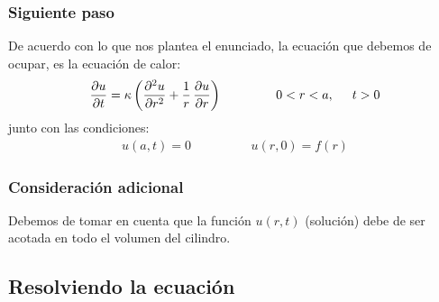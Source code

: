 \documentclass[12pt]{beamer}
\begin{document}
\begin{frame}
\frametitle{Siguiente paso}
De acuerdo con lo que nos plantea el enunciado, la ecuación que debemos de ocupar, es la ecuación de calor:
\pause
\begin{align}
\pdv{u}{t} = \kappa \left( \pdv[2]{u}{r} + \dfrac{1}{r}  \, \pdv{u}{r} \right) \hspace{1.5cm} 0 < r < a, \hspace{0.5cm} t > 0
\label{eq:ecuacion_CilBessel_01}
\end{align}
\pause
junto con las condiciones:
\pause
\begin{align}
u(a, t) = 0 \hspace{2cm} u(r, 0) = f(r)
\label{eq:ecuacion_CilBessel_02}
\end{align}
\end{frame}
\begin{frame}
\frametitle{Consideración adicional}
Debemos de tomar en cuenta que la función $u(r, t)$ (solución) debe de ser acotada en todo el volumen del cilindro.
\end{frame}

\subsection{Resolviendo la ecuación}
\end{document}
